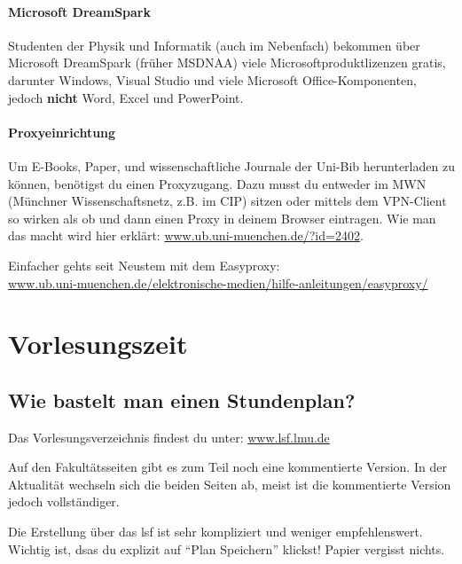 \documentclass[twoside,12pt,parskip=half-]{scrartcl}
\begin{document}
\paragraph{Microsoft DreamSpark}
Studenten der Physik und Informatik (auch im Nebenfach) bekommen über
Microsoft DreamSpark (früher MSDNAA) viele Microsoftproduktlizenzen
gratis, darunter Windows, Visual Studio und viele
Microsoft Office-Komponenten, jedoch \textbf{nicht} Word, Excel und PowerPoint.

\paragraph{Proxyeinrichtung}

Um E-Books, Paper, und wissenschaftliche Journale der Uni-Bib
herunterladen zu können, benötigst du einen Proxyzugang. Dazu musst du
entweder im MWN (Münchner Wissenschaftsnetz, z.B. im CIP) sitzen oder
mittels dem VPN-Client so wirken als ob und dann einen Proxy in deinem
Browser eintragen. Wie man das macht wird hier erklärt:
\url{www.ub.uni-muenchen.de/?id=2402}.

Einfacher gehts seit Neustem mit dem Easyproxy:\\
\url{www.ub.uni-muenchen.de/elektronische-medien/hilfe-anleitungen/easyproxy/}

\clearpage


\section{Vorlesungszeit}

\subsection{Wie bastelt man einen Stundenplan?}

Das Vorlesungsverzeichnis findest du unter: \url{www.lsf.lmu.de}

Auf den Fakultätsseiten gibt es zum Teil noch eine kommentierte
Version. In der Aktualität wechseln sich die beiden Seiten ab, meist
ist die kommentierte Version jedoch vollständiger.

Die Erstellung über das lsf ist sehr kompliziert und weniger
empfehlenswert.  Wichtig ist, dsas du explizit auf ``Plan Speichern''
klickst!  Papier vergisst nichts.
\end{document}
